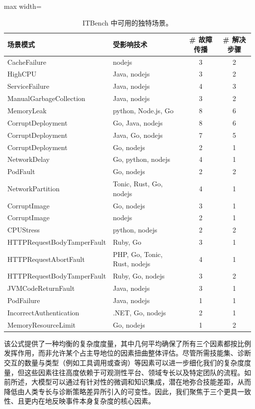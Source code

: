 \begin{table}[H]
\centering
\caption{ITBench 中可用的独特场景。}
\label{tab:itb12}
\begin{adjustbox}{max width=\linewidth}
\begin{tabular}{@{}l l c c@{}}
\toprule
\textbf{场景模式} & \textbf{受影响技术} & \textbf{\# 故障传播} & \textbf{\# 解决步骤} \\
\midrule
CacheFailure & nodejs & 3 & 2 \\
HighCPU & Java, nodejs & 3 & 2 \\
ServiceFailure & Java, nodejs & 4 & 3 \\
ManualGarbageCollection & Java, nodejs & 3 & 2 \\
MemoryLeak & python, Node.js, Go & 8 & 6 \\
CorruptDeployment & Go, Java, nodejs & 8 & 6 \\
CorruptDeployment & Java, Go, nodejs & 7 & 5 \\
CorruptDeployment & Go, nodejs & 2 & 1 \\
NetworkDelay & Go, python, nodejs & 4 & 1 \\
PodFault & Go, nodejs & 2 & 2 \\
NetworkPartition & Tonic, Rust, Go, nodejs & 4 & 1 \\
CorruptImage & Go, nodejs & 3 & 1 \\
CorruptImage & nodejs & 2 & 1 \\
CPUStress & python, nodejs & 2 & 2 \\
HTTPRequestBodyTamperFault & Ruby, Go & 3 & 1 \\
HTTPRequestAbortFault & PHP, Go, Tonic, Rust, nodejs & 4 & 1 \\
HTTPRequestBodyTamperFault & Ruby, Go, nodejs & 3 & 2 \\
JVMCodeReturnFault & Java, nodejs & 3 & 1 \\
PodFailure & Java, nodejs & 1 & 1 \\
IncorrectAuthentication & .NET, Go, nodejs & 2 & 1 \\
MemoryResourceLimit & Go, nodejs & 1 & 2 \\
\bottomrule
\end{tabular}
\end{adjustbox}
\end{table}

该公式提供了一种均衡的复杂度度量，其中几何平均确保了所有三个因素都按比例发挥作用，而非允许某个占主导地位的因素扭曲整体评估。尽管所需技能集、诊断交互的数量与类型（例如工具调用或查询）等因素可以进一步细化我们的复杂度度量，但这些因素往往高度依赖于可观测性平台、领域专长以及特定团队的流程。如前所述，大模型可以通过有针对性的微调和知识集成，潜在地弥合技能差距，从而降低由人类专长与诊断策略差异所引入的可变性。因此，我们聚焦于三个更具一致性、且更内在地反映事件本身复杂度的核心因素。

